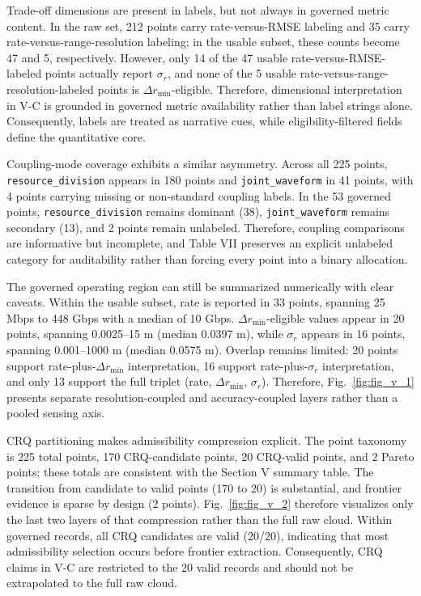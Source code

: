 Trade-off dimensions are present in labels, but not always in governed metric content. In the raw set, 212 points carry rate-versus-RMSE labeling and 35 carry rate-versus-range-resolution labeling; in the usable subset, these counts become 47 and 5, respectively. However, only 14 of the 47 usable rate-versus-RMSE-labeled points actually report $\sigma_r$, and none of the 5 usable rate-versus-range-resolution-labeled points is $\Delta r_{\min}$-eligible. Therefore, dimensional interpretation in V-C is grounded in governed metric availability rather than label strings alone. Consequently, labels are treated as narrative cues, while eligibility-filtered fields define the quantitative core.

Coupling-mode coverage exhibits a similar asymmetry. Across all 225 points, \texttt{resource\_division} appears in 180 points and \texttt{joint\_waveform} in 41 points, with 4 points carrying missing or non-standard coupling labels. In the 53 governed points, \texttt{resource\_division} remains dominant (38), \texttt{joint\_waveform} remains secondary (13), and 2 points remain unlabeled. Therefore, coupling comparisons are informative but incomplete, and Table VII preserves an explicit unlabeled category for auditability rather than forcing every point into a binary allocation.

The governed operating region can still be summarized numerically with clear caveats. Within the usable subset, rate is reported in 33 points, spanning 25 Mbps to 448 Gbps with a median of 10 Gbps. $\Delta r_{\min}$-eligible values appear in 20 points, spanning 0.0025--15 m (median 0.0397 m), while $\sigma_r$ appears in 16 points, spanning 0.001--1000 m (median 0.0575 m). Overlap remains limited: 20 points support rate-plus-$\Delta r_{\min}$ interpretation, 16 support rate-plus-$\sigma_r$ interpretation, and only 13 support the full triplet (rate, $\Delta r_{\min}$, $\sigma_r$). Therefore, Fig.~\ref{fig:fig_v_1} presents separate resolution-coupled and accuracy-coupled layers rather than a pooled sensing axis.

CRQ partitioning makes admissibility compression explicit. The point taxonomy is 225 total points, 170 CRQ-candidate points, 20 CRQ-valid points, and 2 Pareto points; these totals are consistent with the Section V summary table. The transition from candidate to valid points (170 to 20) is substantial, and frontier evidence is sparse by design (2 points). Fig.~\ref{fig:fig_v_2} therefore visualizes only the last two layers of that compression rather than the full raw cloud. Within governed records, all CRQ candidates are valid (20/20), indicating that most admissibility selection occurs before frontier extraction. Consequently, CRQ claims in V-C are restricted to the 20 valid records and should not be extrapolated to the full raw cloud.


